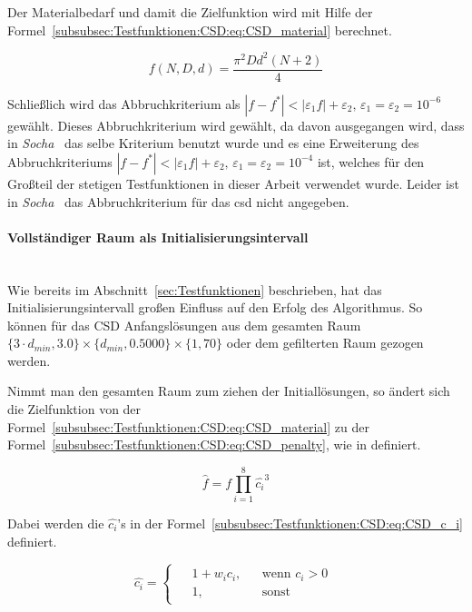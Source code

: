 \documentclass[fontsize=12, a4aper]{scrartcl}
\begin{document}
	\noindent Der Materialbedarf und damit die Zielfunktion wird mit Hilfe der Formel~\ref{subsubsec:Testfunktionen:CSD:eq:CSD_material} berechnet.
	
	\begin{equation} \label{subsubsec:Testfunktionen:CSD:eq:CSD_material}
		f(N, D, d) = \frac{\pi^2 D d^2 (N + 2)}{4}
	\end{equation}

	Schließlich wird das Abbruchkriterium als \(|f - f^*| < |\varepsilon_1 f| + \varepsilon_2, \, \varepsilon_1 = \varepsilon_2 = 10^{-6}\) gewählt. Dieses Abbruchkriterium wird gewählt, da davon ausgegangen wird, dass in \textit{Socha}~\cite{socha2009ant} das selbe Kriterium benutzt wurde und es eine Erweiterung des Abbruchkriteriums \(|f - f^*| < |\varepsilon_1 f| + \varepsilon_2, \, \varepsilon_1 = \varepsilon_2 = 10^{-4}\) ist, welches für den Großteil der stetigen Testfunktionen in dieser Arbeit verwendet wurde. Leider ist in \textit{Socha}~\cite{socha2009ant} das Abbruchkriterium für das \ac{csd} nicht angegeben.
	
	\paragraph{Vollständiger Raum als Initialisierungsintervall}\mbox{}\\
	\newline
	\noindent Wie bereits im Abschnitt~\ref{sec:Testfunktionen} beschrieben, hat das Initialisierungsintervall großen Einfluss auf den Erfolg %
	des Algorithmus. So können für das CSD Anfangslösungen aus dem gesamten Raum \(\{3 \cdot d_{min}, 3.0\} \times \{d_{min}, 0.5000\} \times \{1, 70\}\) oder dem gefilterten Raum gezogen werden.\hfill\newline
	
	Nimmt man den gesamten Raum zum ziehen der Initiallösungen, so ändert sich die Zielfunktion von der Formel~\ref{subsubsec:Testfunktionen:CSD:eq:CSD_material} zu der Formel~\ref{subsubsec:Testfunktionen:CSD:eq:CSD_penalty}, wie in \cite{ACO_2013} definiert.
	
	\begin{equation} \label{subsubsec:Testfunktionen:CSD:eq:CSD_penalty}
		\hat{f} = f \prod_{i = 1}^{8} \hat{c_i}^3 
	\end{equation}
	
	Dabei werden die \(\hat{c_i}\)'s in der Formel~\ref{subsubsec:Testfunktionen:CSD:eq:CSD_c_i} definiert.
	
	\begin{equation} \label{subsubsec:Testfunktionen:CSD:eq:CSD_c_i}
		\hat{c_i} =
		\begin{cases}
			\begin{aligned}
				& 1 + w_i c_i, &&\text{wenn } c_i > 0\\
				& 1, &&\text{sonst}
			\end{aligned}
		\end{cases}
	\end{equation}
	
\end{document}
